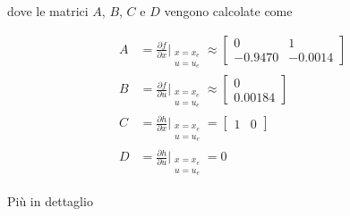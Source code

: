 \documentclass[a4paper, 11pt]{article}
\begin{document}
dove le matrici $A$, $B$, $C$ e $D$ vengono calcolate come

\begin{subequations}
\begin{align}
    A &= \frac{\partial f}{\partial x}\bigg|_{\substack{x = x_e \\ u = u_e}} \approx \begin{bmatrix}
        0 & 1
        \\ -0.9470 & -0.0014
    \end{bmatrix}
    \\
    B &= \frac{\partial f}{\partial u}\bigg|_{\substack{x = x_e \\ u = u_e}} \approx \begin{bmatrix}
        0
        \\ 0.00184
    \end{bmatrix}
    \\
    C &= \frac{\partial h}{\partial x}\bigg|_{\substack{x = x_e \\ u = u_e}} = \begin{bmatrix}
        1 & 0
    \end{bmatrix}
    \\
    D &= \frac{\partial h}{\partial u}\bigg|_{\substack{x = x_e \\ u = u_e}} = 0
\end{align}
\end{subequations}

Più in dettaglio
\end{document}
